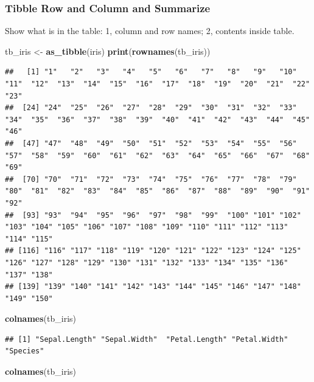 \documentclass[
]{book}
\newenvironment{Shaded}{\begin{snugshade}}{\end{snugshade}}
\newcommand{\KeywordTok}[1]{\textcolor[rgb]{0.13,0.29,0.53}{\textbf{#1}}}
\newcommand{\NormalTok}[1]{#1}
\newcommand{\StringTok}[1]{\textcolor[rgb]{0.31,0.60,0.02}{#1}}
\begin{document}
\hypertarget{tibble-row-and-column-and-summarize}{%
\subsubsection{Tibble Row and Column and Summarize}\label{tibble-row-and-column-and-summarize}}

Show what is in the table: 1, column and row names; 2, contents inside table.

\begin{Shaded}
\begin{Highlighting}[]
\NormalTok{tb\_iris \textless{}{-}}\StringTok{ }\KeywordTok{as\_tibble}\NormalTok{(iris)}
\KeywordTok{print}\NormalTok{(}\KeywordTok{rownames}\NormalTok{(tb\_iris))}
\end{Highlighting}
\end{Shaded}

\begin{verbatim}
##   [1] "1"   "2"   "3"   "4"   "5"   "6"   "7"   "8"   "9"   "10"  "11"  "12"  "13"  "14"  "15"  "16"  "17"  "18"  "19"  "20"  "21"  "22"  "23" 
##  [24] "24"  "25"  "26"  "27"  "28"  "29"  "30"  "31"  "32"  "33"  "34"  "35"  "36"  "37"  "38"  "39"  "40"  "41"  "42"  "43"  "44"  "45"  "46" 
##  [47] "47"  "48"  "49"  "50"  "51"  "52"  "53"  "54"  "55"  "56"  "57"  "58"  "59"  "60"  "61"  "62"  "63"  "64"  "65"  "66"  "67"  "68"  "69" 
##  [70] "70"  "71"  "72"  "73"  "74"  "75"  "76"  "77"  "78"  "79"  "80"  "81"  "82"  "83"  "84"  "85"  "86"  "87"  "88"  "89"  "90"  "91"  "92" 
##  [93] "93"  "94"  "95"  "96"  "97"  "98"  "99"  "100" "101" "102" "103" "104" "105" "106" "107" "108" "109" "110" "111" "112" "113" "114" "115"
## [116] "116" "117" "118" "119" "120" "121" "122" "123" "124" "125" "126" "127" "128" "129" "130" "131" "132" "133" "134" "135" "136" "137" "138"
## [139] "139" "140" "141" "142" "143" "144" "145" "146" "147" "148" "149" "150"
\end{verbatim}

\begin{Shaded}
\begin{Highlighting}[]
\KeywordTok{colnames}\NormalTok{(tb\_iris)}
\end{Highlighting}
\end{Shaded}

\begin{verbatim}
## [1] "Sepal.Length" "Sepal.Width"  "Petal.Length" "Petal.Width"  "Species"
\end{verbatim}

\begin{Shaded}
\begin{Highlighting}[]
\KeywordTok{colnames}\NormalTok{(tb\_iris)}
\end{Highlighting}
\end{Shaded}
\end{document}
